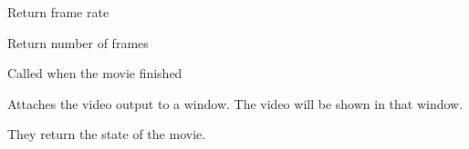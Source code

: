 Return frame rate


\label{wxvideobasedrivergetnbframes}


Return number of frames


\label{wxvideobasedriveronfinished}


Called when the movie finished


\label{wxvideobasedriverattachoutput}


Attaches the video output to a window. The video will be shown in that window.


\label{wxvideobasedriverdetachoutput}



\label{wxvideobasedriverispaused}


They return the state of the movie.


\label{wxvideobasedriverisstopped}


